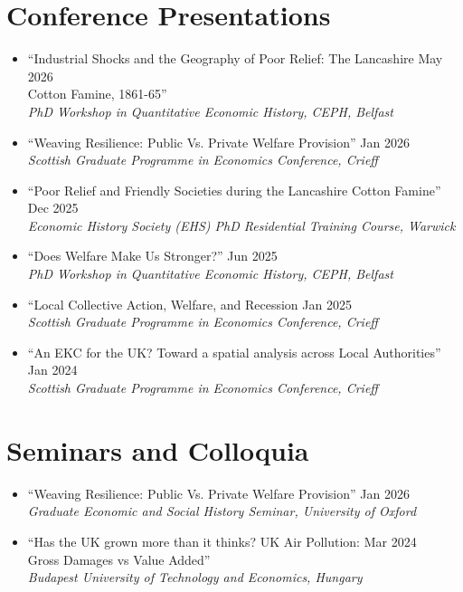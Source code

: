 \documentclass[11pt,a4paper]{article}
\begin{document}
\section{Conference Presentations}
\begin{itemize}
    \item [] ``Industrial Shocks and the Geography of Poor Relief: The Lancashire \hfill May 2026  \\
 Cotton Famine, 1861-65'' \\
\textit{PhD Workshop in Quantitative Economic History, CEPH, Belfast}
    \item [] ``Weaving Resilience: Public Vs. Private Welfare Provision'' \hfill Jan 2026 \\ 
\textit{Scottish Graduate Programme in Economics Conference, Crieff}
    \item [] ``Poor Relief and Friendly Societies during the Lancashire Cotton Famine'' \hfill Dec 2025 \\ 
\textit{Economic History Society (EHS) PhD Residential Training Course, Warwick}
    \item [] ``Does Welfare Make Us Stronger?'' \hfill Jun 2025 \\
\textit{PhD Workshop in Quantitative Economic History, CEPH, Belfast}
    \item [] ``Local Collective Action, Welfare, and Recession \hfill Jan 2025 \\ 
\textit{Scottish Graduate Programme in Economics Conference, Crieff}
    \item [] ``An EKC for the UK? Toward a spatial analysis across Local Authorities'' \hfill Jan 2024 \\
\textit{Scottish Graduate Programme in Economics Conference, Crieff}
\end{itemize}
 
\section{Seminars and Colloquia}
\begin{itemize}
    \item [] ``Weaving Resilience: Public Vs. Private Welfare Provision'' \hfill Jan 2026 \\ 
\textit{Graduate Economic and Social History Seminar, University of Oxford}
    \item [] ``Has the UK grown more than it thinks? UK Air Pollution: \hfill Mar 2024 \\ Gross Damages vs Value Added''  \\
\textit{Budapest University of Technology and Economics, Hungary}
\end{itemize}
\end{document}
